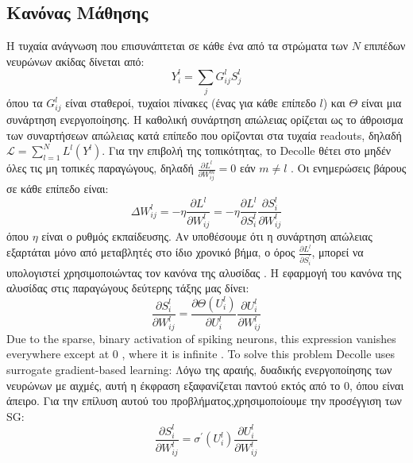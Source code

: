 \documentclass[12pt]{report}
\begin{document}
\subsection{Κανόνας Μάθησης}
Η τυχαία ανάγνωση που επισυνάπτεται σε κάθε ένα από τα στρώματα των $N$ επιπέδων νευρώνων ακίδας δίνεται από:
\begin{equation}
Y_{i}^{l}=\sum_{j} G_{i j}^{l} S_{j}^{l}
\end{equation}
όπου τα $G_{i j}^{l}$ είναι σταθεροί, τυχαίοι πίνακες (ένας για κάθε επίπεδο $l$) και $\Theta$  είναι μια συνάρτηση ενεργοποίησης. Η καθολική συνάρτηση απώλειας ορίζεται ως το άθροισμα των συναρτήσεων απώλειας κατά επίπεδο που ορίζονται στα τυχαία \textlatin{readouts}, δηλαδή $\mathcal{L}=\sum_{l=1}^{N} L^{l}\left(Y^{l}\right)$. Για την επιβολή της τοπικότητας, το \textlatin{Decolle} θέτει στο μηδέν όλες τις μη τοπικές παραγώγους, δηλαδή $\frac{\partial L^{l}}{\partial W_{i j}^{m}}=0$ εάν $m \neq l$ . Οι ενημερώσεις βάρους σε κάθε επίπεδο είναι:
\begin{equation}
\Delta W_{i j}^{l}=-\eta \frac{\partial L^{l}}{\partial W_{i j}^{l}}=-\eta \frac{\partial L^{l}}{\partial S_{i}^{l}} \frac{\partial S_{i}^{l}}{\partial W_{i j}^{l}}
\end{equation}
όπου $\eta$ είναι ο ρυθμός εκπαίδευσης. Αν υποθέσουμε ότι η συνάρτηση απώλειας εξαρτάται μόνο από μεταβλητές στο ίδιο χρονικό βήμα, ο όρος $\frac{\partial L^{l}}{\partial S_{i}^{\prime}}$, μπορεί να υπολογιστεί χρησιμοποιώντας τον κανόνα της αλυσίδας . Η εφαρμογή του κανόνα της αλυσίδας στις παραγώγους δεύτερης τάξης μας δίνει:
\begin{equation}
\frac{\partial S_{i}^{l}}{\partial W_{i j}^{l}}=\frac{\partial \Theta\left(U_{i}^{l}\right)}{\partial U_{i}^{l}} \frac{\partial U_{i}^{l}}{\partial W_{i j}^{l}}
\end{equation}
Due to the sparse, binary activation of spiking neurons, this expression vanishes everywhere except at 0 , where it is infinite . To solve this problem Decolle uses surrogate gradient-based learning:
Λόγω της αραιής, δυαδικής ενεργοποίησης των νευρώνων με αιχμές, αυτή η έκφραση εξαφανίζεται παντού εκτός από το 0, όπου είναι άπειρο. Για την επίλυση αυτού του προβλήματος,χρησιμοποίουμε την προσέγγιση των \textlatin{SG}:
\begin{equation}
\frac{\partial S_{i}^{l}}{\partial W_{i j}^{l}}=\sigma^{\prime}\left(U_{i}^{l}\right) \frac{\partial U_{i}^{l}}{\partial W_{i j}^{l}}
\end{equation}
\end{document}
